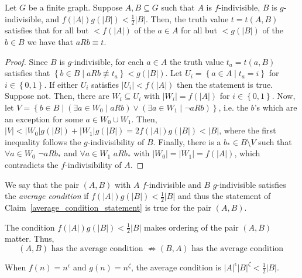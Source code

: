     \lemma[Claim 4.6)]\label{average_condition_statement}
        Let $G$ be a finite graph.
        Suppose $A, B \subseteq G$ such that $A$ is $f$-indivisible, $B$ is $g$-indivisible, and $f(|A|) g(|B|) < \frac{1}{2} |B|$.
        Then, the truth value $t = t(A,B)$ satisfies that for all but $< f(|A|)$ of the $a \in A$ for all but $< g(|B|)$ of
        the $b \in B$ we have that $a R b \equiv t$.
        \begin{proof}
            Since $B$ is $g$-indivisible, for each $a \in A$ the truth value $t_a = t(a,B)$ satisfies that
            $\left\{ b \in B \mid a R b \not\equiv t_a \right\} < g(|B|)$.
            Let $U_i = \left\{ a \in A \mid t_a = i \right\}$ for $i \in \left\{ 0,1 \right\}$.
            If either $U_i$ satisfies $|U_i| < f(|A|)$ then the statement is true.
            Suppose not.
            Then, there are $W_i \subseteq U_i$ with $|W_i| = f(|A|)$ for $i \in \left\{ 0,1 \right\}$.
            Now, let $V = \left\{ b \in B \mid (\exists a \in W_0 \mid a R b) \vee (\exists a \in W_1 \mid \lnot a R b) \right\}$,
            i.e. the $b$'s which are an exception for some $a \in W_0 \cup W_1$.
            Then, $|V| < |W_0| g(|B|) + |W_1| g(|B|) = 2 f(|A|) g(|B|) < |B|$, where the first inequality follows the
            $g$-indivisibility of $B$.
            Finally, there is a $b_* \in B \setminus V$ such that $\forall a \in W_0$ $\lnot a R b_*$ and
            $\forall a \in W_1$ $a R b_*$ with $|W_0| = |W_1| = f(|A|)$, which contradicts the $f$-indivisibility of $A$.
        \end{proof}

        We say that the pair $(A,B)$ with $A$ $f$-indivisible and $B$ $g$-indivisible satisfies the \emph{average condition} if
        $f(|A|) g(|B|) < \frac{1}{2} |B|$ and thus the statement of Claim~\ref{average_condition_statement} is true for
        the pair $(A,B)$.

    \remark
        The condition $f(|A|) g(|B|) < \frac{1}{2} |B|$ makes ordering of the pair $(A,B)$ matter.
        Thus,
        \[
            (A,B) \text{ has the average condition } \not\Rightarrow (B,A) \text{ has the average condition }
        \]

    \remark[Remark 4.7]
        When $f(n) = n^\epsilon$ and $g(n) = n^\zeta$, the average condition is $|A|^\epsilon |B|^\zeta < \frac{1}{2} |B|$.

